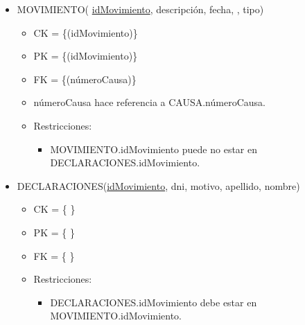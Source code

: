 \begin{itemize}
	
\item MOVIMIENTO( \underline{idMovimiento}, descripción, fecha, , tipo)
	\begin{itemize}
		\item CK = \{(idMovimiento)\}
		\item PK = \{(idMovimiento)\}
		\item FK = \{(númeroCausa)\}
		\item númeroCausa hace referencia a CAUSA.númeroCausa.
		\item Restricciones:
			\begin{itemize}
			\item MOVIMIENTO.idMovimiento puede no estar en DECLARACIONES.idMovimiento.
			\\
			\end{itemize}
	\end{itemize} 
	
\item DECLARACIONES(\underline{idMovimiento}, dni, motivo, apellido, nombre)
	\begin{itemize}
		\item CK = \{ \}
		\item PK = \{ \}
		\item FK = \{ \}
		\item Restricciones:
			\begin{itemize}
			\item DECLARACIONES.idMovimiento debe estar en MOVIMIENTO.idMovimiento.
			\\
			\end{itemize}
	\end{itemize}
	
	
\end{itemize}		